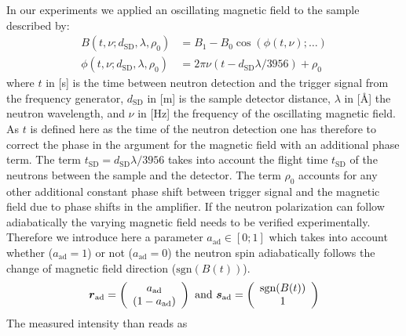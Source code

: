 In our experiments we applied an oscillating magnetic field to the sample described by:
\begin{subequations}
\begin{align}
B(t,\nu;d_\text{SD},\lambda,\rho_0) &= B_1 - B_0
\cos(\phi(t,\nu);\dots) \\
\phi(t,\nu;d_\text{SD},\lambda,\rho_0) &=2\pi\nu(t-d_\text{SD}\lambda/3956)+\rho_0
\end{align}
\end{subequations}
where $t$ in [s] is the time between neutron detection and the trigger signal
from the frequency generator, $d_\text{SD}$ in [m] is the sample
detector distance, $\lambda $ in [\AA] the neutron wavelength, and
$\nu$ in [Hz] the frequency of the oscillating magnetic field. As
$t$ is defined here as the time of the neutron detection one has
therefore to correct the phase in the argument for the magnetic
field with an additional phase term. The term
$t_\text{SD}=d_\text{SD}\lambda/3956$ takes into account the flight
time $t_\text{SD}$ of the neutrons between the sample and the
detector. The term  $\rho_0$ accounts for any other
additional constant phase shift between trigger signal and the
magnetic field due to phase shifts in the amplifier.
If the neutron polarization can follow adiabatically the varying magnetic field needs to be verified
experimentally. Therefore we introduce here a parameter $a_\text{ad} \in [0;1]$ which takes into account
whether ($a_\text{ad}=1$) or not ($a_\text{ad}=0$) the neutron spin adiabatically follows the change
of magnetic field direction ($\text{sgn}(B(t))$).
\begin{align}
\BM{r}_\text{ad} =
\left(
  \begin{array}{c}
     a_\text{ad} \\
     (1-a_\text{ad}) \\
  \end{array}
\right)
\text{ and }
\BM{s}_\text{ad} =
\left(
  \begin{array}{c}
     \text{sgn}(B(t)) \\
     1 \\
  \end{array}
\right)
\end{align}
The measured intensity than reads as
